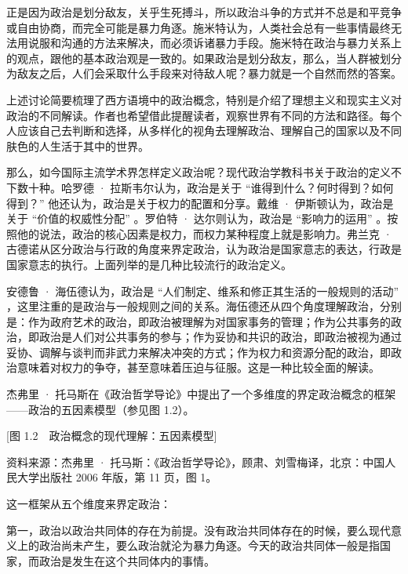 正是因为政治是划分敌友，关乎生死搏斗，所以政治斗争的方式并不总是和平竞争或自由协商，而完全可能是暴力角逐。施米特认为，人类社会总有一些事情最终无法用说服和沟通的方法来解决，而必须诉诸暴力手段。施米特在政治与暴力关系上的观点，跟他的基本政治观是一致的。如果政治是划分敌友，那么，当人群被划分为敌友之后，人们会采取什么手段来对待敌人呢？暴力就是一个自然而然的答案。

上述讨论简要梳理了西方语境中的政治概念，特别是介绍了理想主义和现实主义对政治的不同解读。作者也希望借此提醒读者，观察世界有不同的方法和路径。每个人应该自己去判断和选择，从多样化的视角去理解政治、理解自己的国家以及不同肤色的人生活于其中的世界。


那么，如今国际主流学术界怎样定义政治呢？现代政治学教科书关于政治的定义不下数十种。哈罗德 · 拉斯韦尔认为，政治是关于 “谁得到什么？何时得到？如何得到？” 他还认为，政治是关于权力的配置和分享。戴维 · 伊斯顿认为，政治是关于 “价值的权威性分配” 。罗伯特 · 达尔则认为，政治是 “影响力的运用” 。按照他的说法，政治的核心因素是权力，而权力某种程度上就是影响力。弗兰克 · 古德诺从区分政治与行政的角度来界定政治，认为政治是国家意志的表达，行政是国家意志的执行。上面列举的是几种比较流行的政治定义。

安德鲁 · 海伍德认为，政治是 “人们制定、维系和修正其生活的一般规则的活动” ，这里注重的是政治与一般规则之间的关系。海伍德还从四个角度理解政治，分别是：作为政府艺术的政治，即政治被理解为对国家事务的管理；作为公共事务的政治，即政治是人们对公共事务的参与；作为妥协和共识的政治，即政治被视为通过妥协、调解与谈判而非武力来解决冲突的方式；作为权力和资源分配的政治，即政治意味着对权力的争夺，甚至意味着压迫与征服。这是一种比较全面的解读。

杰弗里 · 托马斯在《政治哲学导论》中提出了一个多维度的界定政治概念的框架——政治的五因素模型（参见图 1.2）。

[图 1.2　政治概念的现代理解：五因素模型]

资料来源：杰弗里 · 托马斯：《政治哲学导论》，顾肃、刘雪梅译，北京：中国人民大学出版社 2006 年版，第 11 页，图 1。

这一框架从五个维度来界定政治：

第一，政治以政治共同体的存在为前提。没有政治共同体存在的时候，要么现代意义上的政治尚未产生，要么政治就沦为暴力角逐。今天的政治共同体一般是指国家，而政治是发生在这个共同体内的事情。


